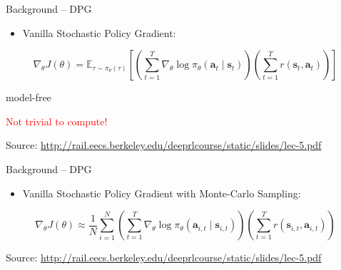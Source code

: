 \begin{frame}{Background -- DPG}
\begin{itemize}
    \item Vanilla Stochastic Policy Gradient:
\end{itemize}
\[
\nabla_\theta J(\theta) = \mathbb{E}_{\tau \sim \pi_\theta(\tau)}\!\left[ \left( \sum_{t=1}^{T} \nabla_\theta \log \pi_\theta(\mathbf{a}_t \mid \mathbf{s}_t) \right) \left( \sum_{t=1}^{T} r(\mathbf{s}_t, \mathbf{a}_t) \right) \right]
\]
\vspace{1em}

\large model-free
\vspace{0.5em}

\textcolor{red}{\large Not trivial to compute!}
\vfill
\begin{flushright}
    \tiny Source: \url{http://rail.eecs.berkeley.edu/deeprlcourse/static/slides/lec-5.pdf}
\end{flushright}
\end{frame}
\begin{frame}{Background -- DPG}
\begin{itemize}
    \item Vanilla Stochastic Policy Gradient with Monte-Carlo Sampling:
\end{itemize}
\[
\nabla_\theta J(\theta) \approx \frac{1}{N} \sum_{i=1}^{N} \left( \sum_{t=1}^{T} \nabla_\theta \log \pi_\theta(\mathbf{a}_{i,t} \mid \mathbf{s}_{i,t}) \right) \left( \sum_{t=1}^{T} r(\mathbf{s}_{i,t}, \mathbf{a}_{i,t}) \right)
\]
\vfill
\begin{flushright}
    \tiny Source: \url{http://rail.eecs.berkeley.edu/deeprlcourse/static/slides/lec-5.pdf}
\end{flushright}
\end{frame}


